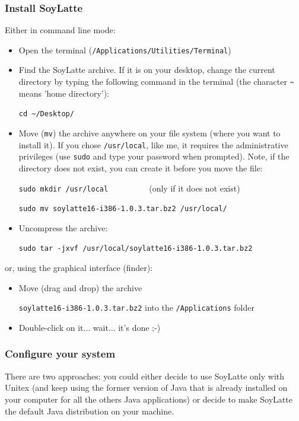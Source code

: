 \subsubsection{Install SoyLatte}
\noindent Either in command line mode:
\begin{itemize}
    \item Open the terminal (\verb+/Applications/Utilities/Terminal+)
    \item Find the SoyLatte archive. If it is on your desktop, change the
    current directory by typing the following command in the terminal 
    (the character \verb+~+ means 'home directory'): 
    
    \bigskip
    \verb+cd ~/Desktop/+
    
    \item Move (\verb+mv+) the archive anywhere on your file system (where you
    want to install it). If you chose \verb+/usr/local+, like me, it requires the
    administrative privileges (use \verb+sudo+ and type your password when
    prompted). Note, if the directory does not exist, you can create it 
    before you move the file:
    
    \bigskip
    \verb+sudo mkdir /usr/local         + (only if it does not exist)
    
    \verb+sudo mv soylatte16-i386-1.0.3.tar.bz2 /usr/local/+

    \item Uncompress the archive:
    
    \bigskip
    \verb+sudo tar -jxvf /usr/local/soylatte16-i386-1.0.3.tar.bz2+ 
\end{itemize}

\bigskip
\noindent or, using the graphical interface (finder):
\begin{itemize}
    \item Move (drag and drop) the archive
    
    \noindent \verb+soylatte16-i386-1.0.3.tar.bz2+ into the \verb+/Applications+ folder
    \item Double-click on it... wait... it's done ;-)
\end{itemize}


\subsubsection{Configure your system}
\noindent There are two approaches: you could either decide to use SoyLatte only
with Unitex (and keep using the former version of Java that is already installed 
on your computer for all the others Java applications) or decide to make SoyLatte 
the default Java distribution on your machine.

